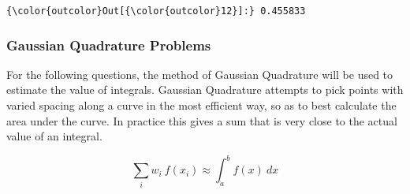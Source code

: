 \documentclass[11pt]{article}
\begin{document}
\begin{Verbatim}[commandchars=\\\{\}]
{\color{outcolor}Out[{\color{outcolor}12}]:} 0.455833
\end{Verbatim}
            
    \subsubsection{Gaussian Quadrature
Problems}\label{gaussian-quadrature-problems}

For the following questions, the method of Gaussian Quadrature will be
used to estimate the value of integrals. Gaussian Quadrature attempts to
pick points with varied spacing along a curve in the most efficient way,
so as to best calculate the area under the curve. In practice this gives
a sum that is very close to the actual value of an integral.

\[\sum_i w_i\ f(x_i) \approx \int_a^b f(x)\ dx\]
\end{document}
